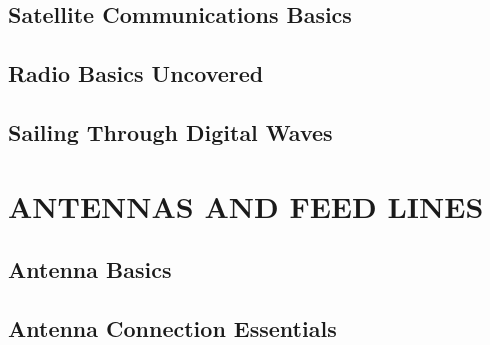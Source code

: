 \documentclass[12pt]{book}
\begin{document}
\section{Satellite Communications Basics}












\section{Radio Basics Uncovered}











\section{Sailing Through Digital Waves}













\chapter{ANTENNAS AND FEED LINES }
\section{Antenna Basics}












\section{Antenna Connection Essentials}












\end{document}
